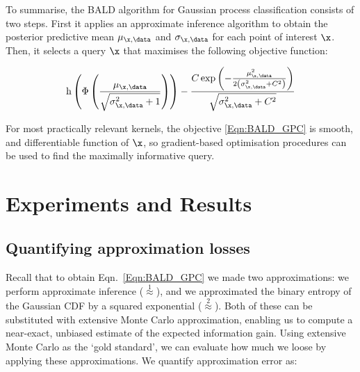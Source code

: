 To summarise, the BALD algorithm for Gaussian process classification consists of two steps. First it applies an approximate inference algorithm to obtain the posterior predictive mean $\mu_{\x,\data}$ and $\sigma_{\x,\data}$ for each point of interest $\x$. Then, it selects a query $\x$ that maximises the following objective function:

\begin{equation}
	\mathrm{h} \left( \Phi\left( \frac{\mu_{\x,\data}}{\sqrt{\sigma^2_{\x,\data} + 1}} \right)\right) - \frac{C \exp\left(-\frac{\mu_{\x,\data}^2}{2\left(\sigma_{\x,\data}^2 + C^2\right)}\right)}{\sqrt{\sigma_{\x,\data}^2 + C^2}} \label{Eqn:BALD_GPC}
\end{equation}

For most practically relevant kernels, the objective \eqref{Eqn:BALD_GPC} is smooth, and differentiable function of $\x$, so gradient-based optimisation procedures can be used to find the maximally informative query.
	

\section{Experiments and Results}

\subsection{Quantifying approximation losses}

Recall that to obtain Eqn.\ \eqref{Eqn:BALD_GPC} we made two approximations: we perform approximate inference ({\scriptsize $\stackrel{1}{\approx}$}), and we approximated the binary entropy of the Gaussian CDF by a squared exponential ({\scriptsize $\stackrel{2}{\approx}$}). Both of these can be substituted with extensive Monte Carlo approximation, enabling us to compute a near-exact, unbiased estimate of the expected information gain. Using extensive Monte Carlo as the `gold standard', we can evaluate how much we loose by applying these approximations. We quantify approximation error as: 

